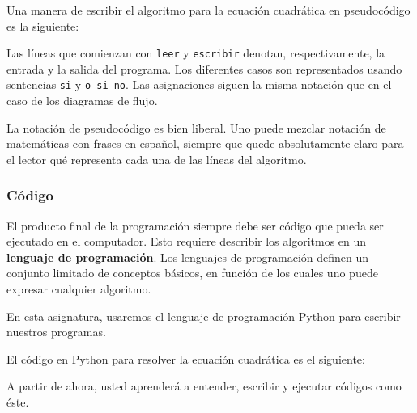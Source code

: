 Una manera de escribir el algoritmo para la ecuación cuadrática en
pseudocódigo es la siguiente:

%
%
%
%

Las líneas que comienzan con \lstinline!leer! y \lstinline!escribir!
denotan, respectivamente, la entrada y la salida del programa. Los
diferentes casos son representados usando sentencias \lstinline!si! y
\lstinline!o si no!. Las asignaciones siguen la misma notación que en el
caso de los diagramas de flujo.

La notación de pseudocódigo es bien liberal. Uno puede mezclar notación
de matemáticas con frases en español, siempre que quede absolutamente
claro para el lector qué representa cada una de las líneas del
algoritmo.

\subsubsection{Código}

El producto final de la programación siempre debe ser código que pueda
ser ejecutado en el computador. Esto requiere describir los algoritmos
en un \textbf{lenguaje de programación}. Los lenguajes de programación
definen un conjunto limitado de conceptos básicos, en función de los
cuales uno puede expresar cualquier algoritmo.

En esta asignatura, usaremos el lenguaje de programación
\href{http://python.org/}{Python} para escribir nuestros programas.

El código en Python para resolver la ecuación cuadrática es el
siguiente:

A partir de ahora, usted aprenderá a entender, escribir y ejecutar
códigos como éste.
